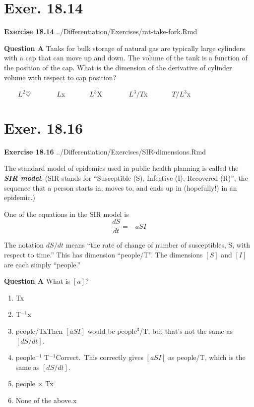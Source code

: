 \documentclass[
  letterpaper,
  DIV=11,
  numbers=noendperiod,
  oneside]{article}
\providecommand{\tightlist}{%
  \setlength{\itemsep}{0pt}\setlength{\parskip}{0pt}}\usepackage{longtable,booktabs,array}
\begin{document}
\begin{multicols}{2}
\hypertarget{exer.-18.14}{%
\section*{Exer. 18.14}\label{exer.-18.14}}

\textbf{Exercise 18.14} ../Differentiation/Exercises/rat-take-fork.Rmd

\textbf{Question A} Tanks for bulk storage of natural gas are typically
large cylinders with a cap that can move up and down. The volume of the
tank is a function of the position of the cap. What is the dimension of
the derivative of cylinder volume with respect to cap position?

~~~~{\(L^2\){\(\heartsuit\ \)}}~~~~~~~{\(L\){x}}~~~~~~~{\(L^3\){︎X
}}~~~~~~~{\(L^3/T\){x}}~~~~~~~{\(T/L^3\){x}}

\hypertarget{exer.-18.16}{%
\section*{Exer. 18.16}\label{exer.-18.16}}

\textbf{Exercise 18.16} ../Differentiation/Exercises/SIR-dimensions.Rmd

The standard model of epidemics used in public health planning is called
the \textbf{\emph{SIR model}}. (SIR stands for ``Susceptible (S),
Infective (I), Recovered (R)'', the sequence that a person starts in,
moves to, and ends up in (hopefully!) in an epidemic.)

One of the equations in the SIR model is \[\frac{dS}{dt} = -a S I\]

The notation \(dS/dt\) means ``the rate of change of number of
susceptibles, S, with respect to time.'' This has dimension
``people/T''. The dimensions \([S]\) and \([I]\) are each simply
``people.''

\textbf{Question A} What is \([a]\)?

\begin{enumerate}
\def\labelenumi{\roman{enumi}.}
\tightlist
\item
  {T{x}}\\
\item
  {T\(^{-1}\){x}}\\
\item
  {people/T{xThen \([a S I]\) would be people\(^3\)/T, but that's not
  the same as \([dS/dt]\).}}\\
\item
  {people\(^{-1}\) T\(^{-1}\){Correct.~This correctly gives \([a S I]\)
  as people/T, which is the same as \([dS/dt]\).}}\\
\item
  {people \(\times\) T{x}}\\
\item
  {None of the above.{x}}
\end{enumerate}


\end{multicols}
\end{document}
